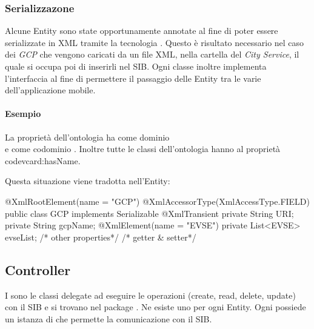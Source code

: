 \subsubsection{Serializzazone} 

Alcune Entity sono state opportunamente annotate al fine di poter essere serializzate in XML tramite la tecnologia . Questo è risultato necessario nel caso dei \emph{GCP} che vengono caricati da un file XML, nella cartella del \emph{City Service}, il quale si occupa poi di inserirli nel SIB. Ogni classe inoltre implementa l'interfaccia  al fine di permettere il passaggio delle Entity tra le varie  dell'applicazione mobile.

\paragraph{Esempio}

La proprietà dell'ontologia  ha come dominio \\  e come codominio . Inoltre tutte le classi dell'ontologia hanno al proprietà code{vcard:hasName}.

Questa situazione viene tradotta nell'Entity:

\begin{java}[caption={Entity di esempio},label=lst:entity]
@XmlRootElement(name = "GCP")
@XmlAccessorType(XmlAccessType.FIELD)
public class GCP implements Serializable {
	@XmlTransient
	private String URI;
	private String gcpName;
	@XmlElement(name = "EVSE")
	private List<EVSE> evseList;
	/* other properties*/
	/* getter & setter*/	
}
\end{java}

\subsection{Controller}

I  sono le classi delegate ad eseguire le operazioni  (create, read, delete, update) con il SIB e si trovano nel package . Ne esiste uno per ogni Entity. Ogni  possiede un istanza di  che permette la comunicazione con il SIB. 

